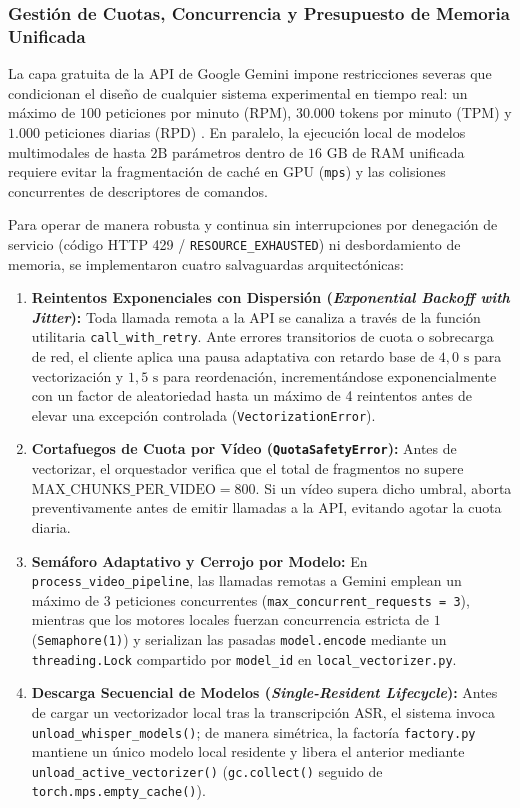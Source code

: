 \subsubsection{Gestión de Cuotas, Concurrencia y Presupuesto de Memoria Unificada}
La capa gratuita de la API de Google Gemini impone restricciones severas que condicionan el diseño de cualquier sistema experimental en tiempo real: un máximo de $100$ peticiones por minuto (RPM), $30.000$ tokens por minuto (TPM) y $1.000$ peticiones diarias (RPD) \cite{gemini_emb2_docs}. En paralelo, la ejecución local de modelos multimodales de hasta $2\text{B}$ parámetros dentro de $16\text{ GB}$ de RAM unificada requiere evitar la fragmentación de caché en GPU (\texttt{mps}) y las colisiones concurrentes de descriptores de comandos.

Para operar de manera robusta y continua sin interrupciones por denegación de servicio (código HTTP 429 / \texttt{RESOURCE\_EXHAUSTED}) ni desbordamiento de memoria, se implementaron cuatro salvaguardas arquitectónicas:
\begin{enumerate}
    \item \textbf{Reintentos Exponenciales con Dispersión (\textit{Exponential Backoff with Jitter}):} Toda llamada remota a la API se canaliza a través de la función utilitaria \texttt{call\_with\_retry}. Ante errores transitorios de cuota o sobrecarga de red, el cliente aplica una pausa adaptativa con retardo base de $4,0\text{ s}$ para vectorización y $1,5\text{ s}$ para reordenación, incrementándose exponencialmente con un factor de aleatoriedad hasta un máximo de 4 reintentos antes de elevar una excepción controlada (\texttt{VectorizationError}).
    \item \textbf{Cortafuegos de Cuota por Vídeo (\texttt{QuotaSafetyError}):} Antes de vectorizar, el orquestador verifica que el total de fragmentos no supere $\text{MAX\_CHUNKS\_PER\_VIDEO} = 800$. Si un vídeo supera dicho umbral, aborta preventivamente antes de emitir llamadas a la API, evitando agotar la cuota diaria.
    \item \textbf{Semáforo Adaptativo y Cerrojo por Modelo:} En \texttt{process\_\allowbreak video\_\allowbreak pipeline}, las llamadas remotas a Gemini emplean un máximo de $3$ peticiones concurrentes (\texttt{max\_\allowbreak concurrent\_\allowbreak requests = 3}), mientras que los motores locales fuerzan concurrencia estricta de $1$ (\texttt{Semaphore(1)}) y serializan las pasadas \texttt{model.encode} mediante un \texttt{threading.Lock} compartido por \texttt{model\_id} en \texttt{local\_\allowbreak vectorizer.py}.
    \item \textbf{Descarga Secuencial de Modelos (\textit{Single-Resident Lifecycle}):} Antes de cargar un vectorizador local tras la transcripción ASR, el sistema invoca \texttt{unload\_whisper\_models()}; de manera simétrica, la factoría \texttt{factory.py} mantiene un único modelo local residente y libera el anterior mediante \texttt{unload\_active\_vectorizer()} (\texttt{gc.collect()} seguido de \texttt{torch.mps.empty\_cache()}).
\end{enumerate}

